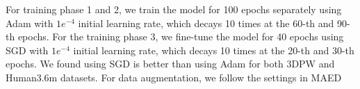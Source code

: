 For training phase 1 and 2,  we train the model for 100 epochs separately using Adam with $1 e^{-4}$ initial learning rate, which decays 10 times at the 60-th and 90-th epochs. For the training phase 3, we fine-tune the model for 40 epochs using SGD with $1 e^{-4}$  initial learning rate, which decays 10 times at the 20-th and 30-th epochs. We found using SGD is better than using Adam for both 3DPW and Human3.6m datasets. For data augmentation, we follow the settings in MAED~\citep{maed:wan2021encoder}





\begin{table}[!htbp]\footnotesize
	\caption{Study on the sequence length of the input video clip for the temporal Transformer model.}
	\label{appendix:seq_len}
	\centering
	
	
	
\end{table}



	
		
